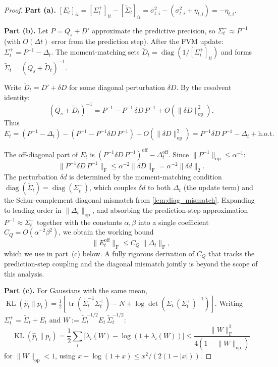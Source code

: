 \documentclass{article}
\theoremstyle{plain}
\theoremstyle{definition}
\theoremstyle{remark}
\DeclareMathOperator{\tr}{tr}
\DeclareMathOperator{\diag}{diag}
\DeclareMathOperator{\KL}{KL}
\newcommand{\norm}[1]{\lVert #1 \rVert}
\newcommand{\fnorm}[1]{\lVert #1 \rVert_{\mathrm{F}}}
\newcommand{\opnorm}[1]{\lVert #1 \rVert_{\mathrm{op}}}
\begin{document}
\begin{proof}
\textbf{Part (a).} $[E_t]_{ii} = [\Sigma_t^+]_{ii} - [\widetilde{\Sigma}_t]_{ii} = \sigma_{t,i}^2 - (\sigma_{t,i}^2 + \eta_{t,i}) = -\eta_{t,i}$.

\medskip\noindent
\textbf{Part (b).} Let $P = Q_s + D'$ approximate the predictive precision, so $\Sigma_t^- \approx P^{-1}$ (with $O(\Delta t)$ error from the prediction step). After the FVM update: $\Sigma_t^+ = P^{-1} - \Delta_t$. The moment-matching sets $\widetilde{D}_t = \diag(1/[\Sigma_t^+]_{ii})$ and forms $\widetilde{\Sigma}_t = (Q_s + \widetilde{D}_t)^{-1}$.

Write $\widetilde{D}_t = D' + \delta D$ for some diagonal perturbation $\delta D$. By the resolvent identity:
\[
(Q_s + \widetilde{D}_t)^{-1} = P^{-1} - P^{-1}\,\delta D\, P^{-1} + O(\opnorm{\delta D}^2).
\]
Thus $E_t = (P^{-1} - \Delta_t) - (P^{-1} - P^{-1}\delta D\, P^{-1}) + O(\opnorm{\delta D}^2) = P^{-1}\delta D\, P^{-1} - \Delta_t + \text{h.o.t.}$

The off-diagonal part of $E_t$ is $(P^{-1}\delta D\, P^{-1})^{\mathrm{off}} - \Delta_t^{\mathrm{off}}$. Since $\opnorm{P^{-1}} \leq \alpha^{-1}$:
\[
\fnorm{P^{-1}\delta D\, P^{-1}} \leq \alpha^{-2}\fnorm{\delta D} = \alpha^{-2}\norm{\delta d}_2.
\]
The perturbation $\delta d$ is determined by the moment-matching condition $\diag(\widetilde{\Sigma}_t) = \diag(\Sigma_t^+)$, which couples $\delta d$ to both $\Delta_t$ (the update term) and the Schur-complement diagonal mismatch from \cref{lem:diag_mismatch}. Expanding to leading order in $\opnorm{\Delta_t}$, and absorbing the prediction-step approximation $P^{-1} \approx \Sigma_t^-$ together with the constants $\alpha, \beta$ into a single coefficient $C_Q = O(\alpha^{-2}\beta^2)$, we obtain the working bound
\begin{equation}\label{eq:E_off_bound}
\fnorm{E_t^{\mathrm{off}}} \leq C_Q\,\fnorm{\Delta_t},
\end{equation}
which we use in part~(c) below. A fully rigorous derivation of $C_Q$ that tracks the prediction-step coupling and the diagonal mismatch jointly is beyond the scope of this analysis.

\medskip\noindent
\textbf{Part (c).} For Gaussians with the same mean, $\KL(\hat{p}_t \| p_t) = \frac{1}{2}[\tr(\widetilde{\Sigma}_t^{-1}\Sigma_t^+) - N + \log\det(\widetilde{\Sigma}_t\,(\Sigma_t^+)^{-1})]$. Writing $\Sigma_t^+ = \widetilde{\Sigma}_t + E_t$ and $W := \widetilde{\Sigma}_t^{-1/2}E_t\,\widetilde{\Sigma}_t^{-1/2}$:
\begin{equation}\label{eq:kl_perturb}
\KL(\hat{p}_t\|p_t) = \frac{1}{2}\sum_i\bigl[\lambda_i(W) - \log(1 + \lambda_i(W))\bigr] \leq \frac{\fnorm{W}^2}{4(1 - \opnorm{W})}
\end{equation}
for $\opnorm{W} < 1$, using $x - \log(1+x) \leq x^2/(2(1-|x|))$.


\end{proof}
\end{document}
